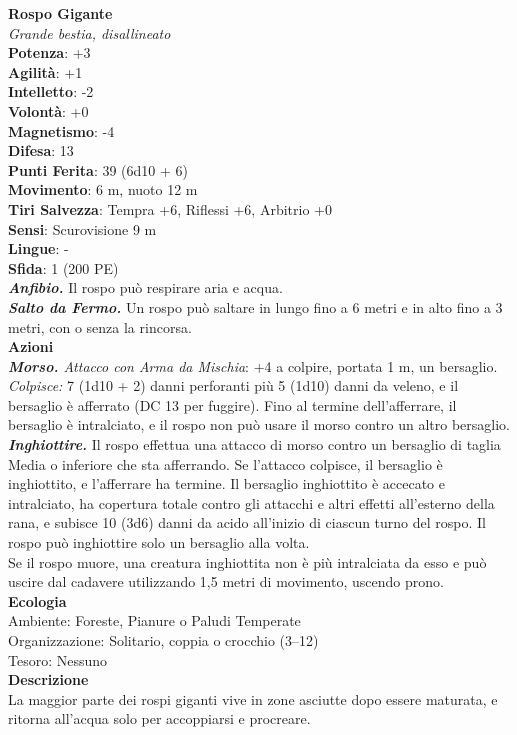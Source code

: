 \begin{multicols}{2}
\medskip\textbf{Rospo Gigante}\\
\emph{Grande bestia, disallineato}\\
\textbf{Potenza}: +3\\
\textbf{Agilità}: +1\\
\textbf{Intelletto}: -2\\
\textbf{Volontà}: +0\\
\textbf{Magnetismo}: -4\\
\textbf{Difesa}: 13\\
\textbf{Punti Ferita}: 39 (6d10 + 6)\\
\textbf{Movimento}: 6 m, nuoto 12 m\\
\textbf{Tiri Salvezza}: Tempra +6, Riflessi +6, Arbitrio +0\\
\textbf{Sensi}: Scurovisione 9 m\\
\textbf{Lingue}: -\\
\textbf{Sfida}: 1 (200 PE)\smallskip\\
\emph{\textbf{Anfibio.}} Il rospo può respirare aria e acqua.\\
\emph{\textbf{Salto da Fermo.}} Un rospo può saltare in lungo fino a 6 metri e in alto fino a 3 metri, con o senza la rincorsa.\\
\smallskip\textbf{Azioni}\\
\emph{\textbf{Morso.} Attacco con Arma da Mischia}: +4 a colpire, portata 1 m, un bersaglio.\\

\emph{Colpisce:} 7 (1d10 + 2) danni perforanti più 5 (1d10) danni da veleno, e il bersaglio è afferrato (DC 13 per fuggire). Fino al termine dell'afferrare, il bersaglio è intralciato, e il rospo non può usare il morso contro un altro bersaglio.  \\
\emph{\textbf{Inghiottire.}} Il rospo effettua una attacco di morso contro un bersaglio di taglia Media o inferiore che sta afferrando. Se l'attacco colpisce, il bersaglio è inghiottito, e l'afferrare ha termine. Il bersaglio inghiottito è accecato e intralciato, ha copertura totale contro gli attacchi e altri effetti all'esterno della rana, e subisce 10 (3d6) danni da acido all'inizio di ciascun turno del rospo. Il rospo può inghiottire solo un bersaglio alla volta.\\
Se il rospo muore, una creatura inghiottita non è più intralciata da esso e può uscire dal cadavere utilizzando 1,5 metri di movimento, uscendo prono.\\
\textbf{Ecologia}\\
Ambiente: Foreste, Pianure o Paludi Temperate\\
Organizzazione: Solitario, coppia o crocchio (3–12)\\
Tesoro: Nessuno\\
\textbf{Descrizione}\\
La maggior parte dei rospi giganti vive in zone asciutte dopo essere maturata, e ritorna all’acqua solo per accoppiarsi e procreare.\\


\end{multicols}
